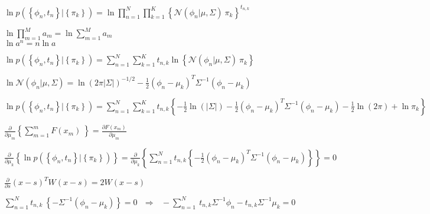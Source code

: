 \documentclass{article}
\begin{document}
$ \displaystyle
    \ln{p\left(\left\{\phi_n,t_n\right\}|\left\{\pi_k\right\}\right)}=\ln{
        \prod_{n=1}^{N}{
            \prod_{k=1}^{K}{
                \left\{\mathcal{N}\left(\phi_n|\mu,\Sigma\right)\ \pi_k\right\}^{t_{n,k}}
                }\
            }
        }
$
\begin{center}
    $ \displaystyle \ln{\prod_{m=1}^{M}a_m}=\ln{\sum_{m=1}^{M}a_m} $ \\
    $ \displaystyle \ln{a^n}=n\ln{a} $
\end{center}

$ \displaystyle
    \ln{
        p\left(\left\{\phi_n,t_n\right\}|\left\{\pi_k\right\}\right)
    }=
    \sum_{n=1}^{N}{
        \sum_{k=1}^{K}{t_{n,k}{
            \ln{
                \left\{\mathcal{N}\left(\phi_n|\mu,\Sigma\right)\ \pi_k\right\}}
            }
        }
    }
$
\begin{center}
    $\displaystyle \ln{\mathcal{N}\left(\phi_n|\mu,\Sigma\right)}=\ln{\left(2\pi\left|\Sigma\right|\right)^{-1/2}}-\frac{1}{2}\left(\phi_n-\mu_k\right)^T\Sigma^{-1}\left(\phi_n-\mu_k\right) $
\end{center}

$\displaystyle
    \ln{
        p\left(\left\{\phi_n,t_n\right\}|\left\{\pi_k\right\}\right)
    }=\sum_{n=1}^{N}{
        \sum_{k=1}^{K}{t_{n,k}{
            \left\{-\frac{1}{2}\ln{\left(\left|\Sigma\right|\right)}-\frac{1}{2}\left(\phi_n-\mu_k\right)^T\Sigma^{-1}\left(\phi_n-\mu_k\right)-\frac{1}{2}\ln{\left(2\pi\right)}+\ln{\pi_k}\right\}}
        }
    }
$
\begin{center}
    $\displaystyle \frac{\partial}{\partial\mu_m}\left\{\sum_{m=1}^{m}{F\left(x_m\right)\ }\right\}=\frac{\partial F\left(x_m\right)}{\partial\mu_m}$
\end{center}

$ \displaystyle
    \frac{\partial}{\partial\mu_k}\left\{\ln{p\left(\left\{\phi_n,t_n\right\}|\left\{\pi_k\right\}\right)}\right\}=\frac{\partial}{\partial\mu_k}\left\{\sum_{n=1}^{N}{t_{n,k}\left\{-\frac{1}{2}\left(\phi_n-\mu_k\right)^T\Sigma^{-1}\left(\phi_n-\mu_k\right)\right\}}\right\}=0
$

\begin{center}
    $ \displaystyle \frac{\partial}{\partial s}\left(x-s\right)^TW\left(x-s\right)=2W\left(x-s\right) $
\end{center}

$ \displaystyle
    \sum_{n=1}^{N}{t_{n,k}\ \left\{-\Sigma^{-1}\left(\phi_n-\mu_k\right)\right\}}=0\ \ \ \Longrightarrow\ \ \ -\sum_{n=1}^{N}{\ t_{n,k}\Sigma^{-1}\phi_n-t_{n,k}\Sigma^{-1}\mu_k}=0
$
\end{document}
